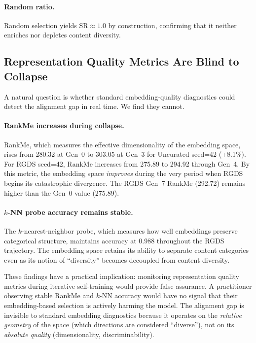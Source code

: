 \paragraph{Random ratio.} Random selection yields $\text{SR} \approx 1.0$ by construction, confirming that it neither enriches nor depletes content diversity.

\subsection{Representation Quality Metrics Are Blind to Collapse}
\label{sec:blind_metrics}

A natural question is whether standard embedding-quality diagnostics could detect the alignment gap in real time. We find they cannot.

\paragraph{RankMe increases during collapse.} RankMe, which measures the effective dimensionality of the embedding space, rises from 280.32 at Gen~0 to 303.05 at Gen~3 for Uncurated seed=42 (+8.1\%). For RGDS seed=42, RankMe increases from 275.89 to 294.92 through Gen~4. By this metric, the embedding space \textit{improves} during the very period when RGDS begins its catastrophic divergence. The RGDS Gen~7 RankMe (292.72) remains higher than the Gen~0 value (275.89).

\paragraph{$k$-NN probe accuracy remains stable.} The $k$-nearest-neighbor probe, which measures how well embeddings preserve categorical structure, maintains accuracy at 0.988 throughout the RGDS trajectory. The embedding space retains its ability to separate content categories even as its notion of ``diversity'' becomes decoupled from content diversity.

These findings have a practical implication: monitoring representation quality metrics during iterative self-training would provide false assurance. A practitioner observing stable RankMe and $k$-NN accuracy would have no signal that their embedding-based selection is actively harming the model. The alignment gap is invisible to standard embedding diagnostics because it operates on the \textit{relative geometry} of the space (which directions are considered ``diverse''), not on its \textit{absolute quality} (dimensionality, discriminability).

